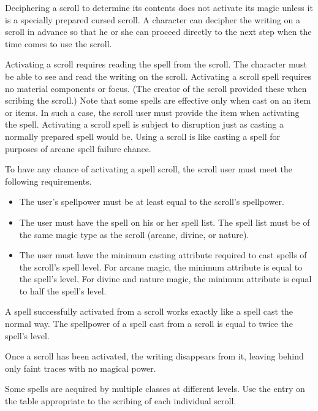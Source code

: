 Deciphering a scroll to determine its contents does not activate its magic unless it is a specially prepared cursed scroll.
A character can decipher the writing on a scroll in advance so that he or she can proceed directly to the next step when the time comes to use the scroll.

 Activating a scroll requires reading the spell from the scroll.
The character must be able to see and read the writing on the scroll.
Activating a scroll spell requires no material components or focus.
(The creator of the scroll provided these when scribing the scroll.) Note that some spells are effective only when cast on an item or items.
In such a case, the scroll user must provide the item when activating the spell.
Activating a scroll spell is subject to disruption just as casting a normally prepared spell would be.
Using a scroll is like casting a spell for purposes of arcane spell failure chance.

To have any chance of activating a spell scroll, the scroll user must meet the following requirements.
\begin{itemize}
    \item The user's spellpower must be at least equal to the scroll's spellpower.
    \item The user must have the spell on his or her spell list.
        The spell list must be of the same magic type as the scroll (arcane, divine, or nature).
    \item The user must have the minimum casting attribute required to cast spells of the scroll's spell level.
        For arcane magic, the minimum attribute is equal to the spell's level.
        For divine and nature magic, the minimum attribute is equal to half the spell's level.
\end{itemize}

 A spell successfully activated from a scroll works exactly like a spell cast the normal way.
The spellpower of a spell cast from a scroll is equal to twice the spell's level.

Once a scroll has been activated, the writing disappears from it, leaving behind only faint traces with no magical power.

 Some spells are acquired by multiple classes at different levels.
Use the entry on the table appropriate to the scribing of each individual scroll.

